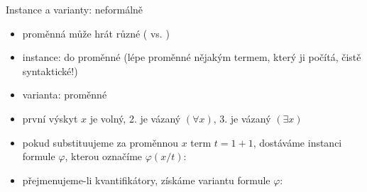 \documentclass{beamer}
\begin{document}
\begin{frame}{Instance a varianty: neformálně}

    \begin{itemize}
        \item proměnná může hrát různé   ( vs. ) \pause 
        \item \alert{instance}:  do  proměnné \pause (lépe  proměnné nějakým termem, který ji počítá, čistě syntaktické!) \pause 
        \item \alert{varianta}:   proměnné \pause 
    \end{itemize}
    
     \pause 

    \begin{itemize}
        \item první výskyt $x$ je volný, 2. je vázaný $(\forall x)$, 3. je vázaný  $(\exists x)$ \pause 
        \item pokud \alert{substituujeme} za proměnnou $x$ term $t=1+1$, dostáváme \alert{instanci} formule $\varphi$, kterou označíme \alert{$\varphi(x/t)$}: \pause 
         \pause 
        \item přejmenujeme-li kvantifikátory, získáme \alert{variantu} formule $\varphi$: \pause 
         \pause 
    \end{itemize}


\end{frame}
\end{document}
